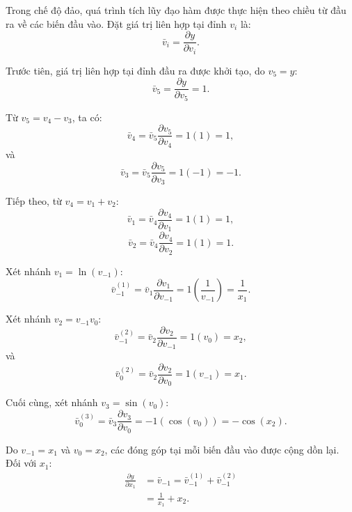 Trong chế độ đảo, quá trình tích lũy đạo hàm được thực hiện theo chiều từ đầu ra về các biến đầu vào. Đặt giá trị liên hợp tại đỉnh $v_i$ là:
\begin{equation}
    \bar{v}_i = \frac{\partial y}{\partial v_i}.
\end{equation}

Trước tiên, giá trị liên hợp tại đỉnh đầu ra được khởi tạo, do $v_5 = y$:
\begin{equation}
    \bar{v}_5 = \frac{\partial y}{\partial v_5} = 1.
\end{equation}

Từ $v_5 = v_4 - v_3$, ta có:
\begin{equation}
    \bar{v}_4 = \bar{v}_5 \frac{\partial v_5}{\partial v_4} = 1(1) = 1,
\end{equation}
và
\begin{equation}
    \bar{v}_3 = \bar{v}_5 \frac{\partial v_5}{\partial v_3} = 1(-1) = -1.
\end{equation}

Tiếp theo, từ $v_4 = v_1 + v_2$:
\begin{equation}
    \bar{v}_1 = \bar{v}_4 \frac{\partial v_4}{\partial v_1} = 1(1) = 1,
\end{equation}
\begin{equation}
    \bar{v}_2 = \bar{v}_4 \frac{\partial v_4}{\partial v_2} = 1(1) = 1.
\end{equation}

Xét nhánh $v_1 = \ln(v_{-1})$:
\begin{equation}
    \bar{v}_{-1}^{(1)} = \bar{v}_1 \frac{\partial v_1}{\partial v_{-1}} = 1\left(\frac{1}{v_{-1}}\right) = \frac{1}{x_1}.
\end{equation}

Xét nhánh $v_2 = v_{-1} v_0$:
\begin{equation}
    \bar{v}_{-1}^{(2)} = \bar{v}_2 \frac{\partial v_2}{\partial v_{-1}} = 1(v_0) = x_2,
\end{equation}
và
\begin{equation}
    \bar{v}_0^{(2)} = \bar{v}_2 \frac{\partial v_2}{\partial v_0} = 1(v_{-1}) = x_1.
\end{equation}

Cuối cùng, xét nhánh $v_3 = \sin(v_0)$:
\begin{equation}
    \bar{v}_0^{(3)} = \bar{v}_3 \frac{\partial v_3}{\partial v_0} = -1(\cos(v_0)) = -\cos(x_2).
\end{equation}

Do $v_{-1} = x_1$ và $v_0 = x_2$, các đóng góp tại mỗi biến đầu vào được cộng dồn lại. Đối với $x_1$:
\begin{equation}
\begin{aligned}
    \frac{\partial y}{\partial x_1} &= \bar{v}_{-1} = \bar{v}_{-1}^{(1)} + \bar{v}_{-1}^{(2)} \\
    &= \frac{1}{x_1} + x_2.
\end{aligned}
\end{equation}

